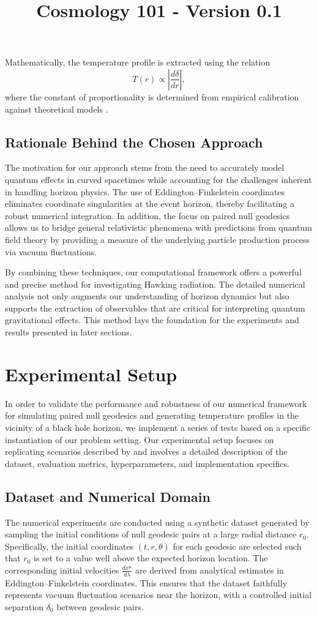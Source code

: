 \documentclass{article}\usepackage{graphicx} \usepackage{amsmath} \usepackage{colortbl}\title{Cosmology 101 - Version 0.1}
\begin{document}
Mathematically, the temperature profile is extracted using the relation
\begin{equation}
T(r) \propto \left| \frac{d\delta}{dr}\right|, 
\end{equation}
where the constant of proportionality is determined from empirical calibration against theoretical models \cite{Unruh1976}. 

\subsection{Rationale Behind the Chosen Approach}
The motivation for our approach stems from the need to accurately model quantum effects in curved spacetimes while accounting for the challenges inherent in handling horizon physics. The use of Eddington–Finkelstein coordinates eliminates coordinate singularities at the event horizon, thereby facilitating a robust numerical integration. In addition, the focus on paired null geodesics allows us to bridge general relativistic phenomena with predictions from quantum field theory by providing a measure of the underlying particle production process via vacuum fluctuations.

By combining these techniques, our computational framework offers a powerful and precise method for investigating Hawking radiation. The detailed numerical analysis not only augments our understanding of horizon dynamics but also supports the extraction of observables that are critical for interpreting quantum gravitational effects. This method lays the foundation for the experiments and results presented in later sections.

\section{Experimental Setup}
In order to validate the performance and robustness of our numerical framework for simulating paired null geodesics and generating temperature profiles in the vicinity of a black hole horizon, we implement a series of tests based on a specific instantiation of our problem setting. Our experimental setup focuses on replicating scenarios described by \cite{Hawking1975,Jacobson1993,Unruh1976} and involves a detailed description of the dataset, evaluation metrics, hyperparameters, and implementation specifics.

\subsection{Dataset and Numerical Domain}
The numerical experiments are conducted using a synthetic dataset generated by sampling the initial conditions of null geodesic pairs at a large radial distance $r_{0}$. Specifically, the initial coordinates $(t, r, \theta)$ for each geodesic are selected such that $r_{0}$ is set to a value well above the expected horizon location. The corresponding initial velocities $\frac{dx^{\mu}}{d\lambda}$ are derived from analytical estimates in Eddington--Finkelstein coordinates. This ensures that the dataset faithfully represents vacuum fluctuation scenarios near the horizon, with a controlled initial separation $\delta_{0}$ between geodesic pairs.
\end{document}
